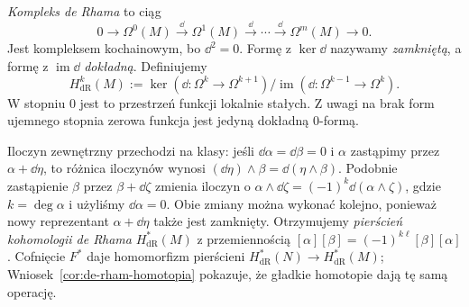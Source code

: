 \begin{definicja}
\label{def:de-rham-cohomology}
\emph{Kompleks de Rhama} to ciąg
\[
 0\longrightarrow\Omega^0(M)\xrightarrow{\dd}
 \Omega^1(M)\xrightarrow{\dd}\cdots
 \xrightarrow{\dd}\Omega^m(M)\longrightarrow0.
\]
Jest kompleksem kochainowym, bo $\dd^2=0$.
Formę z $\ker\dd$ nazywamy \emph{zamkniętą},
a formę z $\operatorname{im}\dd$ \emph{dokładną}. Definiujemy
\[
 H^k_{\mathrm{dR}}(M)
 :=\ker(\dd:\Omega^k\to\Omega^{k+1})/
   \operatorname{im}(\dd:\Omega^{k-1}\to\Omega^k).
\]
W stopniu $0$ jest to przestrzeń funkcji lokalnie stałych.
Z uwagi na brak form ujemnego stopnia zerowa funkcja
jest jedyną dokładną $0$-formą.
\end{definicja}

Iloczyn zewnętrzny przechodzi na klasy: jeśli
$\dd\alpha=\dd\beta=0$ i $\alpha$ zastąpimy przez
$\alpha+\dd\eta$, to różnica iloczynów wynosi
$(\dd\eta)\wedge\beta=\dd(\eta\wedge\beta)$.
Podobnie zastąpienie $\beta$ przez $\beta+\dd\zeta$
zmienia iloczyn o
$\alpha\wedge\dd\zeta=(-1)^k\dd(\alpha\wedge\zeta)$,
gdzie $k=\deg\alpha$ i użyliśmy $\dd\alpha=0$.
Obie zmiany można wykonać kolejno, ponieważ nowy
reprezentant $\alpha+\dd\eta$ także jest zamknięty.
Otrzymujemy \emph{pierścień kohomologii de Rhama}
$H^*_{\mathrm{dR}}(M)$ z przemiennością
$[\alpha][\beta]=(-1)^{k\ell}[\beta][\alpha]$.
Cofnięcie $F^*$ daje homomorfizm pierścieni
$H^*_{\mathrm{dR}}(N)\to H^*_{\mathrm{dR}}(M)$;
Wniosek~\ref{cor:de-rham-homotopia} pokazuje, że
gładkie homotopie dają tę samą operację.

